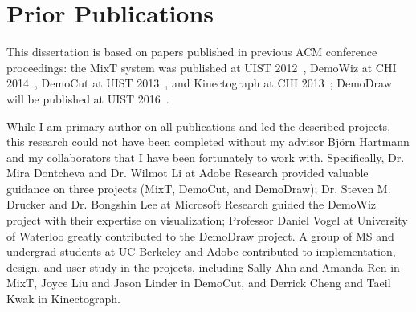 
\section {Prior Publications}

This dissertation is based on papers published in previous ACM conference proceedings: the MixT system was published at UIST 2012~\cite{Chi:2012:MAG:2380116.2380130}, DemoWiz at CHI 2014~\cite{Chi:2014:DRS:2556288.2557254}, DemoCut at UIST 2013~\cite{Chi:2013:DGC:2501988.2502052}, and Kinectograph at CHI 2013~\cite{Cheng:2013:BCC:2468356.2468568}; DemoDraw will be published at UIST 2016~\cite{Chi:2016:DemoDraw}.

While I am primary author on all publications and led the described projects, this research could not have been completed without my advisor Bj\"orn Hartmann and my collaborators that I have been fortunately to work with. Specifically, Dr. Mira Dontcheva and Dr. Wilmot Li at Adobe Research provided valuable guidance on three projects (MixT, DemoCut, and DemoDraw); Dr. Steven M. Drucker and Dr. Bongshin Lee at Microsoft Research guided the DemoWiz project with their expertise on visualization; Professor Daniel Vogel at University of Waterloo greatly contributed to the DemoDraw project. A group of MS and undergrad students at UC Berkeley and Adobe contributed to implementation, design, and user study in the projects, including Sally Ahn and Amanda Ren in MixT, Joyce Liu and Jason Linder in DemoCut, and Derrick Cheng and Taeil Kwak in Kinectograph.

